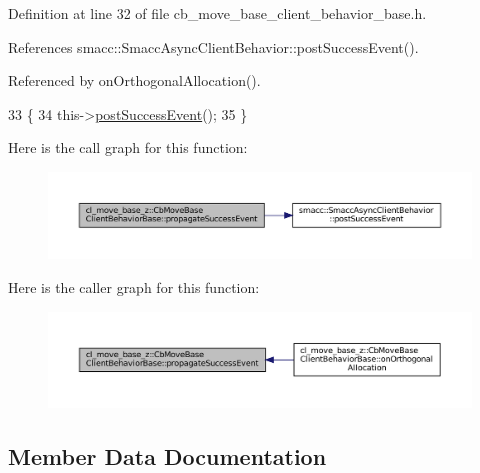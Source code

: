 Definition at line 32 of file cb\+\_\+move\+\_\+base\+\_\+client\+\_\+behavior\+\_\+base.\+h.



References smacc\+::\+Smacc\+Async\+Client\+Behavior\+::post\+Success\+Event().



Referenced by on\+Orthogonal\+Allocation().


\begin{DoxyCode}
33         \{
34             this->\hyperlink{classsmacc_1_1SmaccAsyncClientBehavior_adf18efe1f0e4eacc1277b8865a8a94b1}{postSuccessEvent}();
35         \}
\end{DoxyCode}
Here is the call graph for this function\+:
\nopagebreak
\begin{figure}[H]
\begin{center}
\leavevmode
\includegraphics[width=350pt]{classcl__move__base__z_1_1CbMoveBaseClientBehaviorBase_a12109fd9132a93140e4f022ee052e2ed_cgraph}
\end{center}
\end{figure}
Here is the caller graph for this function\+:
\nopagebreak
\begin{figure}[H]
\begin{center}
\leavevmode
\includegraphics[width=350pt]{classcl__move__base__z_1_1CbMoveBaseClientBehaviorBase_a12109fd9132a93140e4f022ee052e2ed_icgraph}
\end{center}
\end{figure}


\subsection{Member Data Documentation}
\mbox{\label{classcl__move__base__z_1_1CbMoveBaseClientBehaviorBase_ab2ef219464cfac8659b4a87c8d0db6d5}} 
